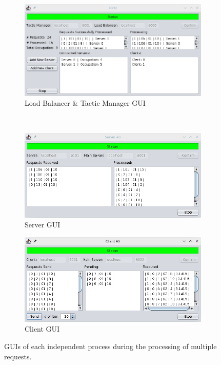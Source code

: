 \documentclass[12pt]{article}
\begin{document}
\clearpage
\begin{figure}[H]
  \centering
  \begin{subfigure}{.55\textwidth}
    \centering
    \includegraphics[width=.95\linewidth]{img/LBM_active.png}
    \caption{Load Balancer \& Tactic Manager GUI}
    \label{fig:LBM_active}
  \end{subfigure} \\
  \begin{subfigure}{.5\textwidth}
    \centering
    \includegraphics[width=.95\linewidth]{img/S_active.png}
    \caption{Server GUI}
    \label{fig:S_active}
  \end{subfigure}%
  \begin{subfigure}{.5\textwidth}
    \centering
    \includegraphics[width=.95\linewidth]{img/C_active.png}
    \caption{Client GUI}
    \label{fig:C_active}
  \end{subfigure}
  \caption{GUIs of each independent process during the processing of multiple requests.}
  \label{fig:GUIs_active}
\end{figure} 
\end{document}
